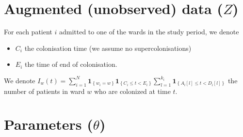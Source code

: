 \documentclass[10pt]{article}
\begin{document}
\section*{Augmented (unobserved) data ($Z$)}

For each patient $i$ admitted to one of the wards in the study period, we denote 
\begin{itemize}
	\item $C_i$ the colonisation time (we assume no supercolonisations)
	\item $E_i$ the time of end of colonisation.
\end{itemize}



\noindent We denote $I_w\left(t\right)=\sum_{i=1}^{N} \mathbf{1}_{\left\lbrace w_i=w \right\rbrace} \mathbf{1}_{\left\lbrace C_i \leq t < E_i \right\rbrace} \sum_{l=1}^{k_i} \mathbf{1}_{\left\lbrace A_i[l] \leq t < D_i[l] \right\rbrace} $  the number of patients in ward $w$ who are colonized at time $t$.

\section*{Parameters ($\theta$)}
\end{document}
